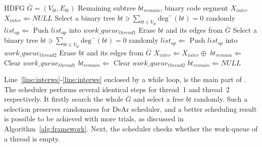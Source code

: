 \begin{algorithm}[ht!]
    \caption{}
    \begin{algorithmic}[1]
        \Require    HDFG $\bar{G} = (V_{bt}, E_{bt})$
        \Ensure     Remaining subtree $bt_{remain}$, binary code segment $X_{inter}$
        \State $X_{inter} \Leftarrow NULL$       
         \label{line:interws}
        \State Select a binary tree $bt \ni \sum_{bt \in V_{bt}}\textrm{deg}^-(bt) = 0$ randomly
        \State $list_{op} \Leftarrow$ 
        \State Push $list_{op}$ into $work\_queue_{thread1}$
        \State Erase $bt$ and its edges from $\bar{G}$
        \EndIf
        \State Select a binary tree $bt \ni \sum_{bt \in V_{bt}}\textrm{deg}^-(bt) = 0$ randomly
        \State $list_{op} \Leftarrow$ 
        \State Push $list_{op}$ into $work\_queue_{thread2}$
        \State Erase $bt$ and its edges from $\bar{G}$
        \EndIf
        \State $X_{inter} \Leftarrow X_{inter} \oplus$  \label{line:intercon}
        \EndWhile \label{line:interwe}
         \label{line:interis}
        \State $bt_{remain} \Leftarrow$ 
        \State Clear $work\_queue_{thread1}$
        \State $bt_{remain} \Leftarrow$ 
        \State Clear $work\_queue_{thread2}$
        \Else
        \State $bt_{remain} \Leftarrow NULL$
        \EndIf \label{line:interie}
        \State {}
    \end{algorithmic}
    \label{alg:inter}
\end{algorithm}
Line~\ref{line:interws}-\ref{line:interwe} enclosed by a while loop, is the main part of .
The scheduler performs several identical steps for thread~1 and thread~2 respectively.
It firstly search the whole $\bar{G}$ and select a free $bt$ randomly.
Such a selection preserves randomness for DeAr scheduler, 
and a better scheduling result is possible to be achieved with more trials, as discussed in Algorithm~\ref{alg:framework}.
Next, the scheduler checks whether the work-queue of a thread is empty.
